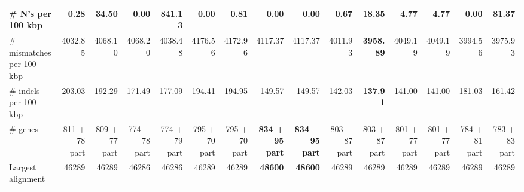 \documentclass[12pt,a4paper]{article}
\begin{document}
\begin{table}[ht]
\begin{center}
\begin{tabular}{|l*{14}{|r}|}
\# N's per 100 kbp & 0.28 & 34.50 & {\bf 0.00} & 841.13 & {\bf 0.00} & 0.81 & {\bf 0.00} & {\bf 0.00} & 0.67 & 18.35 & 4.77 & 4.77 & {\bf 0.00} & 81.37 \\ \hline
\# mismatches per 100 kbp & 4032.85 & 4068.10 & 4068.20 & 4038.48 & 4176.56 & 4172.96 & 4117.37 & 4117.37 & 4011.93 & {\bf 3958.89} & 4049.19 & 4049.19 & 3994.56 & 3975.93 \\ \hline
\# indels per 100 kbp & 203.03 & 192.29 & 171.49 & 177.09 & 194.41 & 194.95 & 149.57 & 149.57 & 142.03 & {\bf 137.91} & 141.00 & 141.00 & 181.03 & 161.42 \\ \hline
\# genes & 811 + 78 part & 809 + 77 part & 774 + 78 part & 774 + 79 part & 795 + 70 part & 795 + 70 part & {\bf 834 + 95 part} & {\bf 834 + 95 part} & 803 + 87 part & 803 + 87 part & 801 + 77 part & 801 + 77 part & 784 + 81 part & 783 + 83 part \\ \hline
Largest alignment & 46289 & 46289 & 46286 & 46286 & 46289 & 46289 & {\bf 48600} & {\bf 48600} & 46289 & 46289 & 46289 & 46289 & 46289 & 46289 \\ \hline
\end{tabular}
\end{center}
\end{table}
\end{document}
